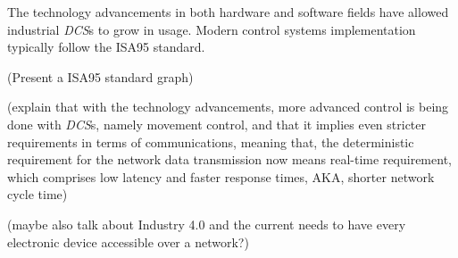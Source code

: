The technology advancements in both hardware and software fields have allowed industrial \emph{DCS}s to grow in usage. Modern control systems implementation typically follow the ISA95 \cite{standard:isa95} standard.

(Present a ISA95 standard graph)

(explain that with the technology advancements, more advanced control is being done with \emph{DCS}s, namely movement control, and that it implies even stricter requirements in terms of communications, meaning that, the deterministic requirement for the network data transmission now means real-time requirement, which comprises low latency and faster response times, AKA, shorter network cycle time)

(maybe also talk about Industry 4.0 and the current needs to have every electronic device accessible over a network?)
